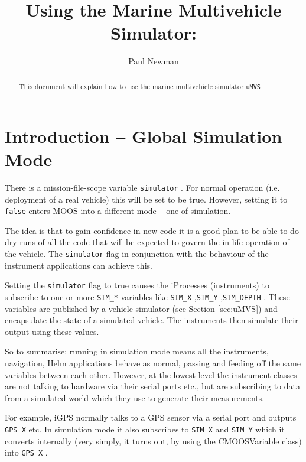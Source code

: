 \documentclass[a4paper,10pt]{article}
\title{Using the Marine Multivehicle Simulator: \code{uMVS} }
\author{Paul Newman}
\newcommand{\Code}[1]{\texttt{#1} }
\newcommand{\code}[1]{\Code{#1} }
\begin{document}
\maketitle

\begin{center}
\end{center}
\begin{abstract}
This document will explain how to use the marine multivehicle simulator \code{uMVS}
\end{abstract}



\section{Introduction -- Global Simulation Mode}\label{Sec:SimMode}

There is a mission-file-scope variable \code{simulator}. For
normal operation (i.e. deployment of a real vehicle) this will be
set to be true. However, setting it to \code{false} enters MOOS
into a different mode -- one of simulation.

The idea is that to gain confidence in new code it is a good plan to
be able to do dry runs of all the code that will be expected to
govern the in-life operation of the vehicle. The \code{simulator} flag in
conjunction with the behaviour of the instrument applications can
achieve this.

Setting the \code{simulator} flag to true causes the iProcesses
(instruments) to subscribe to one or more \code{SIM\_*} variables
like \code{SIM\_X},\code{SIM\_Y},\code{SIM\_DEPTH}. These
variables are published by a vehicle simulator (see Section
\ref{sec:uMVS}) and encapsulate the state of a simulated vehicle.
The instruments then simulate their output using these values.

So to summarise: running in simulation mode means all the
instruments, navigation, Helm applications behave as normal,
passing and feeding off the same variables between each other.
However, at the lowest level the instrument classes are not talking
to hardware via their serial ports etc., but are subscribing to data
from a simulated world which they use to generate their
measurements.

For example, iGPS normally talks to a GPS sensor via a serial port
and outputs \code{GPS\_X} etc. In simulation mode it also
subscribes to \code{SIM\_X} and \code{SIM\_Y} which it converts
internally (very simply, it turns out, by using the CMOOSVariable
class) into \code{GPS\_X}.
\end{document}
